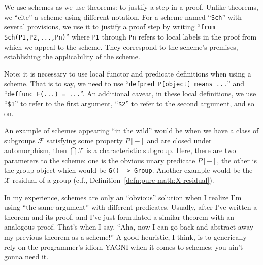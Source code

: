 We use schemes as we use theorems: to justify a step in a proof. Unlike
theorems, we ``cite'' a scheme using different notation. For a scheme
named ``\lstinline{Sch}'' with several provisions, we use it to justify
a proof step by writing ``\lstinline{from Sch(P1,P2,...,Pn)}'' where
\verb#P1# through \verb#Pn# refers to local labels in the proof from
which we appeal to the scheme. They correspond to the scheme's premises,
establishing the applicability of the scheme.

Note: it is necessary to use local functor and predicate definitions
when using a scheme. That is to say, we need to use
``\lstinline{defpred P[object] means ...}'' and
``\lstinline{deffunc F(...) = ...}''. An additional caveat, in these
local definitions, we use ``\lstinline{$1}'' to refer to the first
argument, ``\lstinline{$2}'' to refer to the second argument, and so on.

An example of schemes appearing ``in the wild'' would be when we
have a class of subgroups $\mathcal{F}$ satisfying some property $P[-]$
and are closed under automorphism, then $\bigcap\mathcal{F}$ is a
characteristic subgroup. Here, there are two parameters to the scheme:
one is the obvious unary predicate $P[-]$, the other is the group object
which would be \verb#G() -> Group#.
Another example would be the $\mathcal{X}$-residual of a group (c.f.,
Definition~\ref{defn:pure-math:X-residual}).

In my experience, schemes are only an ``obvious'' solution when I
realize I'm using ``the same argument'' with different
predicates. Usually, after I've written a theorem and its proof, and
I've just formulated a similar theorem with an analogous proof. That's
when I say, ``Aha, now I can go back and abstract away my previous
theorem as a scheme!'' A good heuristic, I think, is to generically rely
on the programmer's idiom YAGNI when it comes to schemes: you ain't
gonna need it.